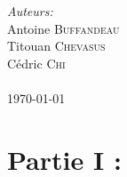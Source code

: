 \documentclass[12pt]{article}
\begin{document}
\begin{titlepage}
\Large \emph{Auteurs:}\\
Antoine \textsc{Buffandeau}\\
Titouan \textsc{Chevasus}\\
Cédric \textsc{Chi}\\
 \textsc{}
\\[1cm]
{\large \today} %
\vfill
\end{titlepage}
\tableofcontents
\clearpage
\hypertarget{sec:part1}{}
\section{Partie I : }

%
%
\end{document}
